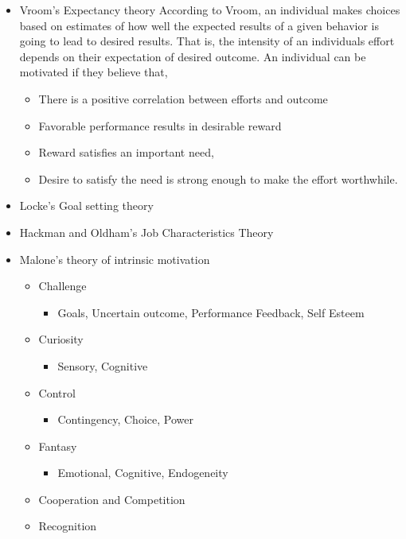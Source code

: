 \documentclass[conference]{IEEEtran}
\begin{document}
\begin{itemize}
\item
  Vroom's Expectancy theory \cite{vroom1959some} According to Vroom,
  an individual makes choices based on estimates of how well the
  expected results of a given behavior is going to lead to desired
  results. That is, the intensity of an individuals effort depends on
  their expectation of desired outcome. An individual can be motivated
  if they believe that,

  \begin{itemize}
  \item
    There is a positive correlation between efforts and outcome
  \item
    Favorable performance results in desirable reward
  \item
    Reward satisfies an important need,
  \item
    Desire to satisfy the need is strong enough to make the effort
    worthwhile.
  \end{itemize}
\item
  Locke's Goal setting theory
\item
  Hackman and Oldham's Job Characteristics Theory
\item
  Malone's theory of intrinsic motivation \cite{malone1987making}

  \begin{itemize}
  \item
    Challenge

    \begin{itemize}
    \item
      Goals, Uncertain outcome, Performance Feedback, Self Esteem
    \end{itemize}
  \item
    Curiosity

    \begin{itemize}
    \item
      Sensory, Cognitive
    \end{itemize}
  \item
    Control

    \begin{itemize}
    \item
      Contingency, Choice, Power
    \end{itemize}
  \item
    Fantasy

    \begin{itemize}
    \item
      Emotional, Cognitive, Endogeneity
    \end{itemize}
  \item
    Cooperation and Competition
  \item
    Recognition
  \end{itemize}
\end{itemize}
\end{document}
